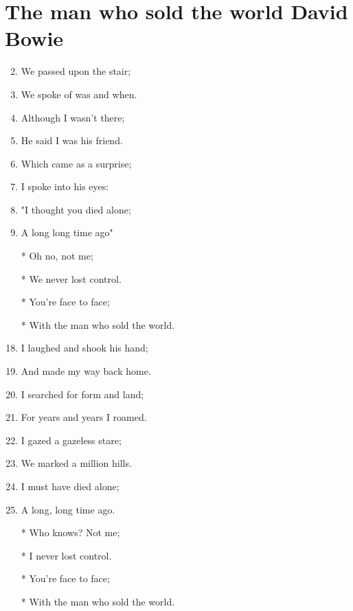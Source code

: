 \documentclass{article}
\begin{document}
    
    \section*{The man who sold the world \of David Bowie}

    \begin{center}
        \begin{enumerate}

            \item[] 
            \item We passed upon the stair;
            \item We spoke of was and when.
            \item Although I wasn't there;
            \item He said I was his friend.
            \item Which came as a surprise;
            \item I spoke into his eyes:
            \item "I thought you died alone;
            \item A long long time ago"
            
            \item[]

            \item[] \chorus
            \item[*] Oh no, not me;
            \item[*] We never lost control.
            \item[*] You're face to face;
            \item[*] With the man who sold the world.
            
            \item[]

            \item[] 
            \item I laughed and shook his hand;
            \item And made my way back home.
            \item I searched for form and land;
            \item For years and years I roamed.
            \item I gazed a gazeless stare;
            \item We marked a million hills.
            \item I must have died alone;
            \item A long, long time ago.
            
            \item[]

            \item[] 
            \item[*] Who knows? Not me;
            \item[*] I never lost control.
            \item[*] You're face to face;
            \item[*] With the man who sold the world.

        \end{enumerate}
    \end{center}
\end{document}
